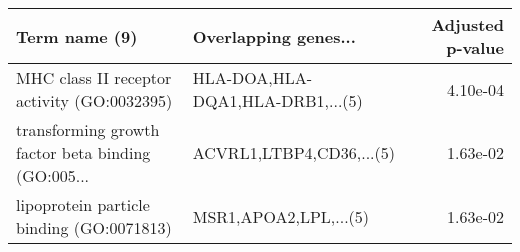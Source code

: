 \begin{tabular}{llr}
\toprule
                                     Term name (9) &             Overlapping genes... &  Adjusted p-value \\
\midrule
       MHC class II receptor activity (GO:0032395) & HLA-DOA,HLA-DQA1,HLA-DRB1,...(5) &          4.10e-04 \\
transforming growth factor beta binding (GO:005... &         ACVRL1,LTBP4,CD36,...(5) &          1.63e-02 \\
         lipoprotein particle binding (GO:0071813) &            MSR1,APOA2,LPL,...(5) &          1.63e-02 \\
\bottomrule
\end{tabular}
